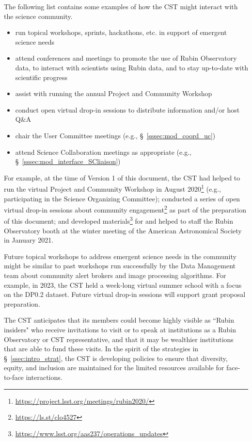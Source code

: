 \documentclass[DM,authoryear,toc]{lsstdoc}
\begin{document}
The following list contains some examples of how the CST might interact with the science community.
\begin{itemize}
\item run topical workshops, sprints, hackathons, etc. in support of emergent science needs
\item attend conferences and meetings to promote the use of Rubin Observatory data, to interact with scientists using Rubin data, and to stay up-to-date with scientific progress
\item assist with running the annual Project and Community Workshop
\item conduct open virtual drop-in sessions to distribute information and/or host Q\&A 
\item chair the User Committee meetings (e.g., \S~\ref{sssec:mod_coord_uc})
\item attend Science Collaboration meetings as appropriate (e.g., \S~\ref{sssec:mod_interface_SCliaison})
\end{itemize}

For example, at the time of Version 1 of this document, the CST had helped to run the virtual Project and Community Workshop in August 2020\footnote{\url{https://project.lsst.org/meetings/rubin2020/}} (e.g., participating in the Science Organizing Committee); conducted a series of open virtual drop-in sessions about community engagement\footnote{\url{https://ls.st/clo4527}} as part of the preparation of this document; and developed materials\footnote{\url{https://www.lsst.org/aas237/operations_updates}} for and helped to staff the Rubin Observatory booth at the winter meeting of the American Astronomical Society in January 2021. 

Future topical workshops to address emergent science needs in the community might be similar to past workshops run successfully by the Data Management team about community alert brokers and image processing algorithms. 
For example, in 2023, the CST held a week-long virtual summer school with a focus on the DP0.2 dataset. 
Future virtual drop-in sessions will support grant proposal preparation. 

The CST anticipates that its members could become highly visible as ``Rubin insiders" who receive invitations to visit or to speak at institutions as a Rubin Observatory or CST representative, and that it may be wealthier institutions that are able to fund these visits.
In the spirit of the strategies in \S~\ref{ssec:intro_strat}, the CST is developing policies to ensure that diversity, equity, and inclusion are maintained for the limited resources available for face-to-face interactions. 
\end{document}
